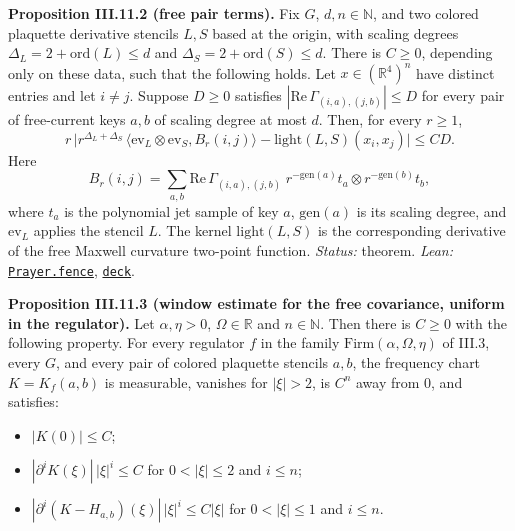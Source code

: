 \documentclass[
  letterpaper,
  11pt]{article}
\providecommand{\tightlist}{%
  \setlength{\itemsep}{0pt}\setlength{\parskip}{0pt}}
\begin{document}
\textbf{Proposition III.11.2 (free pair terms).} Fix \(G\),
\(d,n\in\mathbb N\), and two colored plaquette derivative stencils
\(L,S\) based at the origin, with scaling degrees
\(\Delta_L=2+\mathrm{ord}(L)\le d\) and
\(\Delta_S=2+\mathrm{ord}(S)\le d\). There is \(C\ge0\), depending only
on these data, such that the following holds. Let
\(x\in(\mathbb R^4)^n\) have distinct entries and let \(i\ne j\).
Suppose \(D\ge0\) satisfies \(|\mathrm{Re}\,\Gamma_{(i,a),(j,b)}|\le D\)
for every pair of free-current keys \(a,b\) of scaling degree at most
\(d\). Then, for every \(r\ge1\),
\[r\,\Big|r^{\Delta_L+\Delta_S}\,\langle \mathrm{ev}_L\otimes\mathrm{ev}_S,B_r(i,j)\rangle-\mathrm{light}(L,S)(x_i,x_j)\Big|\le CD.\]
Here
\[B_r(i,j)=\sum_{a,b}\mathrm{Re}\,\Gamma_{(i,a),(j,b)}\;r^{-\mathrm{gen}(a)}t_a\otimes r^{-\mathrm{gen}(b)}t_b,\]
where \(t_a\) is the polynomial jet sample of key \(a\),
\(\mathrm{gen}(a)\) is its scaling degree, and \(\mathrm{ev}_L\) applies
the stencil \(L\). The kernel \(\mathrm{light}(L,S)\) is the
corresponding derivative of the free Maxwell curvature two-point
function. \emph{Status:} theorem. \emph{Lean:}
\href{https://github.com/yang-mills-group/OpenAI-YM-20261028/blob/3456e5e75cf8d4cd558955a5c7638fba2d68f464/YM/Next/RANK/StrideCost.lean\#L70-L98}{\texttt{Prayer.fence}},
\href{https://github.com/yang-mills-group/OpenAI-YM-20261028/blob/3456e5e75cf8d4cd558955a5c7638fba2d68f464/YM/Next/RANK/StrideCost.lean\#L64-L67}{\texttt{deck}}.

\textbf{Proposition III.11.3 (window estimate for the free covariance,
uniform in the regulator).} Let \(\alpha,\eta>0\),
\(\Omega\in\mathbb R\) and \(n\in\mathbb N\). Then there is \(C\ge0\)
with the following property. For every regulator \(f\) in the family
\(\mathrm{Firm}(\alpha,\Omega,\eta)\) of III.3, every \(G\), and every
pair of colored plaquette stencils \(a,b\), the frequency chart
\(K=K_f(a,b)\) is measurable, vanishes for \(|\xi|>2\), is \(C^n\) away
from \(0\), and satisfies:

\begin{itemize}
\tightlist
\item
  \(|K(0)|\le C\);
\item
  \(|\partial^iK(\xi)|\,|\xi|^i\le C\) for \(0<|\xi|\le2\) and
  \(i\le n\);
\item
  \(|\partial^i(K-H_{a,b})(\xi)|\,|\xi|^i\le C|\xi|\) for
  \(0<|\xi|\le1\) and \(i\le n\).
\end{itemize}
\end{document}
